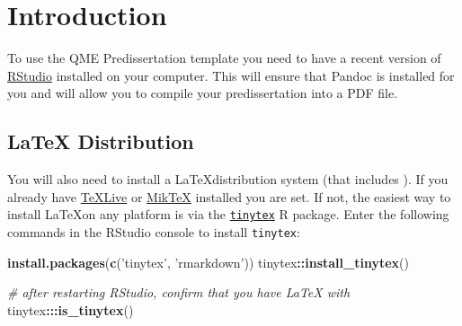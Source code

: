 \documentclass[12pt,letterpaper,oneside,oldfontcommands]{memoir}
\newenvironment{Shaded}{\begin{snugshade}}{\end{snugshade}}
\newcommand{\CommentTok}[1]{\textcolor[rgb]{0.56,0.35,0.01}{\textit{#1}}}
\newcommand{\KeywordTok}[1]{\textcolor[rgb]{0.13,0.29,0.53}{\textbf{#1}}}
\newcommand{\NormalTok}[1]{#1}
\newcommand{\OperatorTok}[1]{\textcolor[rgb]{0.81,0.36,0.00}{\textbf{#1}}}
\newcommand{\StringTok}[1]{\textcolor[rgb]{0.31,0.60,0.02}{#1}}
\theoremstyle{definition}
\theoremstyle{definition}
\theoremstyle{definition}
\theoremstyle{remark}
\begin{document}
\clearpage
\pagestyle{ruled}

\tableofcontents*
\clearpage

\listoftables
\clearpage

\listoffigures
\clearpage





\mainmatter

\SingleSpacing

\hypertarget{intro}{%
\chapter{Introduction}\label{intro}}

To use the QME Predissertation template you need to have a recent
version of
\href{http://www.rstudio.com/products/rstudio/download/}{RStudio}
installed on your computer. This will ensure that Pandoc is installed
for you and will allow you to compile your predissertation into a PDF
file.

\hypertarget{latex-distribution}{%
\section{LaTeX Distribution}\label{latex-distribution}}

You will also need to install a \LaTeX distribution system (that
includes \XeLaTeX). If you already have
\href{https://www.tug.org/texlive/}{TeXLive} or
\href{https://miktex.org/}{MikTeX} installed you are set. If not, the
easiest way to install \LaTeX on any platform is via the
\href{https://yihui.name/tinytex/}{\texttt{tinytex}} R package. Enter
the following commands in the RStudio console to install
\texttt{tinytex}:

\begin{Shaded}
\begin{Highlighting}[]
\KeywordTok{install.packages}\NormalTok{(}\KeywordTok{c}\NormalTok{(}\StringTok{'tinytex'}\NormalTok{, }\StringTok{'rmarkdown'}\NormalTok{))}
\NormalTok{tinytex}\OperatorTok{::}\KeywordTok{install_tinytex}\NormalTok{()}

\CommentTok{# after restarting RStudio, confirm that you have LaTeX with }
\NormalTok{tinytex}\OperatorTok{:::}\KeywordTok{is_tinytex}\NormalTok{()}
\end{Highlighting}
\end{Shaded}
\end{document}
